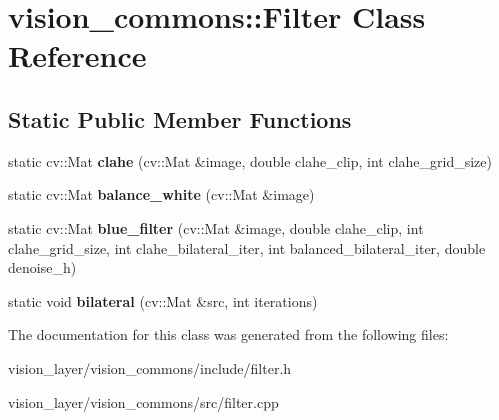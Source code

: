 \hypertarget{classvision__commons_1_1Filter}{}\section{vision\+\_\+commons\+:\+:Filter Class Reference}
\label{classvision__commons_1_1Filter}
\subsection*{Static Public Member Functions}
\begin{DoxyCompactItemize}
\item 
\mbox{\label{classvision__commons_1_1Filter_a54fcd78039a49ff9d0b323013052219b}} 
static cv\+::\+Mat {\bfseries clahe} (cv\+::\+Mat \&image, double clahe\+\_\+clip, int clahe\+\_\+grid\+\_\+size)
\item 
\mbox{\label{classvision__commons_1_1Filter_a372a71db1d4802c610ad7aae69ab325f}} 
static cv\+::\+Mat {\bfseries balance\+\_\+white} (cv\+::\+Mat \&image)
\item 
\mbox{\label{classvision__commons_1_1Filter_ae111029e3b0f4fe991af1edcf1393310}} 
static cv\+::\+Mat {\bfseries blue\+\_\+filter} (cv\+::\+Mat \&image, double clahe\+\_\+clip, int clahe\+\_\+grid\+\_\+size, int clahe\+\_\+bilateral\+\_\+iter, int balanced\+\_\+bilateral\+\_\+iter, double denoise\+\_\+h)
\item 
\mbox{\label{classvision__commons_1_1Filter_ab12e10894d0272f7add8c77638000c78}} 
static void {\bfseries bilateral} (cv\+::\+Mat \&src, int iterations)
\end{DoxyCompactItemize}


The documentation for this class was generated from the following files\+:\begin{DoxyCompactItemize}
\item 
vision\+\_\+layer/vision\+\_\+commons/include/filter.\+h\item 
vision\+\_\+layer/vision\+\_\+commons/src/filter.\+cpp\end{DoxyCompactItemize}
